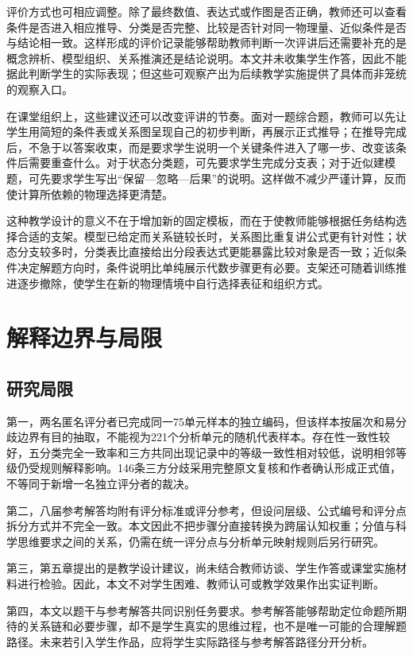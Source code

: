 \documentclass[
  12pt,
  a4paper,twoside,openany]{ctexbook}
\begin{document}
评价方式也可相应调整。除了最终数值、表达式或作图是否正确，教师还可以查看条件是否进入相应推导、分类是否完整、比较是否针对同一物理量、近似条件是否与结论相一致。这样形成的评价记录能够帮助教师判断一次评讲后还需要补充的是概念辨析、模型组织、关系推演还是结论说明。本文并未收集学生作答，因此不能据此判断学生的实际表现；但这些可观察产出为后续教学实施提供了具体而非笼统的观察入口。

在课堂组织上，这些建议还可以改变评讲的节奏。面对一题综合题，教师可以先让学生用简短的条件表或关系图呈现自己的初步判断，再展示正式推导；在推导完成后，不急于以答案收束，而是要求学生说明一个关键条件进入了哪一步、改变该条件后需要重查什么。对于状态分类题，可先要求学生完成分支表；对于近似建模题，可先要求学生写出``保留---忽略---后果''的说明。这样做不减少严谨计算，反而使计算所依赖的物理选择更清楚。

这种教学设计的意义不在于增加新的固定模板，而在于使教师能够根据任务结构选择合适的支架。模型已给定而关系链较长时，关系图比重复讲公式更有针对性；状态分支较多时，分类表比直接给出分段表达式更能暴露比较对象是否一致；近似条件决定解题方向时，条件说明比单纯展示代数步骤更有必要。支架还可随着训练推进逐步撤除，使学生在新的物理情境中自行选择表征和组织方式。

\section{解释边界与局限}\label{ux89e3ux91caux8fb9ux754cux4e0eux5c40ux9650}

\subsection{研究局限}\label{ux7814ux7a76ux5c40ux9650}

第一，两名匿名评分者已完成同一75单元样本的独立编码，但该样本按届次和易分歧边界有目的抽取，不能视为221个分析单元的随机代表样本。存在性一致性较好，五分类完全一致率和三方共同出现记录中的等级一致性相对较低，说明相邻等级仍受规则解释影响。146条三方分歧采用完整原文复核和作者确认形成正式值，不等同于新增一名独立评分者的裁决。

第二，八届参考解答均附有评分标准或评分参考，但设问层级、公式编号和评分点拆分方式并不完全一致。本文因此不把步骤分直接转换为跨届认知权重；分值与科学思维要求之间的关系，仍需在统一评分点与分析单元映射规则后另行研究。

第三，第五章提出的是教学设计建议，尚未结合教师访谈、学生作答或课堂实施材料进行检验。因此，本文不对学生困难、教师认可或教学效果作出实证判断。

第四，本文以题干与参考解答共同识别任务要求。参考解答能够帮助定位命题所期待的关系链和必要步骤，却不是学生真实的思维过程，也不是唯一可能的合理解题路径。未来若引入学生作品，应将学生实际路径与参考解答路径分开分析。
\end{document}
